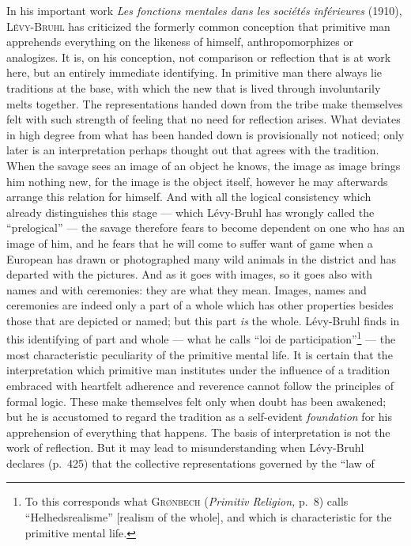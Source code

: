 \documentclass[12pt]{book}
\newcommand{\opage}[1]{\marginnote{\footnotesize\textit{[#1]}}}
\begin{document}
In his important work \textit{Les fonctions mentales dans les sociétés
inférieures} (1910), \textsc{Lévy-Bruhl} has criticized the formerly common
conception that primitive man apprehends everything on the likeness of himself,
anthropomorphizes or analogizes. It is, on his conception, not comparison or
reflection that is at work here, but an entirely immediate identifying. In
primitive man there always lie traditions at the base, with which \opage{10}the new that
is lived through involuntarily melts together. The representations handed down
from the tribe make themselves felt with such strength of feeling that no need
for reflection arises. What deviates in high degree from what has been handed
down is provisionally not noticed; only later is an interpretation perhaps
thought out that agrees with the tradition. When the savage sees an image of an
object he knows, the image as image brings him nothing new, for the image is
the object itself, however he may afterwards arrange this relation for himself.
And with all the logical consistency which already distinguishes this stage ---
which Lévy-Bruhl has wrongly called the ``prelogical'' --- the savage therefore
fears to become dependent on one who has an image of him, and he fears that he
will come to suffer want of game when a European has drawn or photographed many
wild animals in the district and has departed with the pictures. And as it goes
with images, so it goes also with names and with ceremonies: they are what they
mean. Images, names and ceremonies are indeed only a part of a whole which has
other properties besides those that are depicted or named; but this part
\textit{is} the whole. Lévy-Bruhl finds in this identifying of part and whole
--- what he calls ``loi de participation''\footnote{To this corresponds what
\textsc{Grønbech} (\textit{Primitiv Religion,} p.\ 8) calls
``Helhedsrealisme'' [realism of the whole], and which is characteristic for the
primitive mental life.} --- the most characteristic peculiarity of the
primitive mental life. It is certain that the interpretation which primitive
man institutes under the influence of a tradition embraced with heartfelt
adherence and reverence cannot follow the principles of formal logic. These
make themselves felt only when doubt has been awakened; but he is accustomed to
regard the tradition as a self-evident \textit{foundation} for his apprehension of
everything that happens. The \opage{11}basis of interpretation is not the work of
reflection. But it may lead to misunderstanding when Lévy-Bruhl declares
(p.\ 425) that the collective representations governed by the ``law of
\end{document}
